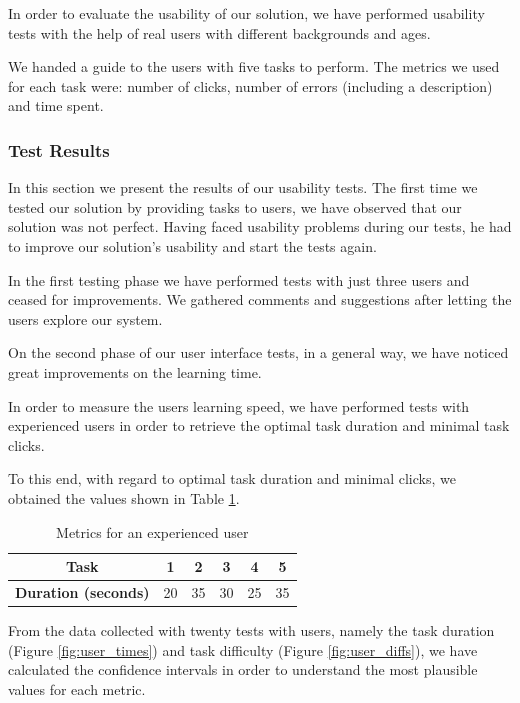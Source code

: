 \documentclass[conference,compsoc,a4paper]{IEEEtran}
\begin{document}
      In order to evaluate the usability of our solution, we have performed usability tests with the help of real users with different backgrounds and ages.

      We handed a guide to the users with five tasks to perform. The metrics we used for each task were: number of clicks, number of errors (including a description) and time spent. 

  \subsubsection{Test Results}

In this section we present the results of our usability tests. The first time we tested our solution by providing tasks to users, we have observed that our solution was not perfect. Having faced usability problems during our tests, he had to improve our solution's usability and start the tests again.


In the first testing phase we have performed tests with just three users and ceased for improvements. We gathered comments and suggestions after letting the users explore our system.

On the second phase of our user interface tests, in a general way, we have noticed great improvements on the learning time.

In order to measure the users learning speed, we have performed tests with experienced users in order to retrieve the optimal task duration and minimal task clicks.

To this end, with regard to optimal task duration and minimal clicks, we obtained the values shown in Table \ref{table:optimal}.


\begin{table}[H]
\centering
\caption{Metrics for an experienced user}
\label{table:optimal}
\begin{tabular}{|c|c|c|c|c|c|}
\hline
\textbf{Task} & 1 & 2 & 3 & 4 & 5 \\ \hline
\textbf{Duration (seconds)} & 20 & 35 & 30 & 25 & 35 \\ \hline
\end{tabular}
\end{table}


From the data collected with twenty tests with users, namely the task duration (Figure \ref{fig:user_times}) and task difficulty (Figure \ref{fig:user_diffs}), we have calculated the confidence intervals in order to understand the most plausible values for each metric.
\end{document}
